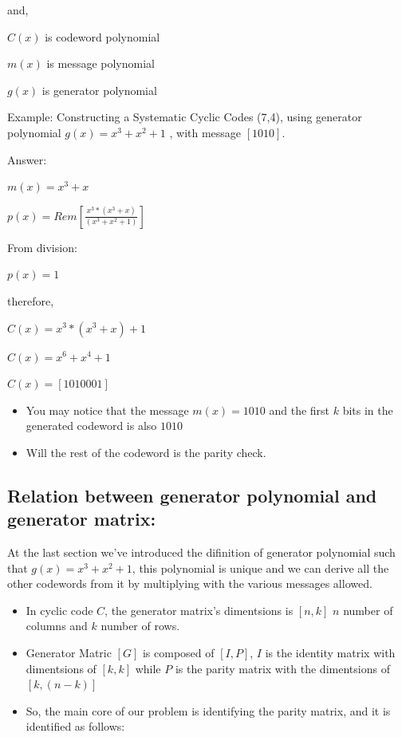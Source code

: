 \documentclass[a4paper,12pt]{report}
\begin{document}
{        and,

        $C(x)$ is codeword polynomial
        
        $m(x)$ is message polynomial
        
        $g(x)$ is generator polynomial

        \vspace{0.5cm}
        Example: Constructing a Systematic Cyclic Codes (7,4), using generator polynomial
        $g(x) = x^3 + x^2 +1$ , with message $[1 0 1 0]$.
        \vspace{0.5cm}
        
        Answer:

        $m(x) = x^3 + x$
        
        $p(x) = Rem \left[ \frac{ x^{3} *\left(x^3 + x\right) }{\left( x^3 + x^2 +1\right)} \right]$

        From division:

        $p(x) = 1$

        therefore,

        $C(x) = x^3 * \left(x^3 + x\right) + 1$
        
        $C(x) = x^6 + x^4 + 1$
        
        $C(x) = \left[1010001\right]$
        
    {\renewcommand\labelitemi{}
    \begin{itemize}
        \item You may notice that the message $m(x) = 1 0 1 0$ and the first $k$ bits in the generated
            codeword is also $1010$
        \item Will the rest of the codeword is the parity check.
    \end{itemize}

        
    \subsection{Relation between generator polynomial and generator matrix:}
        At the last section we've introduced the difinition of generator polynomial
        such that $g(x) =x^3 + x^2 +1 $, this polynomial is unique and we can derive all the other
        codewords from it by multiplying with the various messages allowed.

    {\renewcommand\labelitemi{}
    \begin{itemize}
        \item In cyclic code $C$, the generator matrix's dimentsions is $[n,k]$
            $n$ number of columns and $k$ number of rows.
        \item Generator Matric $[G]$ is composed of $[I,P]$, $I$ is the identity matrix
            with dimentsions of $[k,k]$
            while $P$ is the parity matrix with the dimentsions of $[k, (n-k)]$
        \item So, the main core of our problem is identifying the parity matrix, 
        and it is identified as follows:


\end{itemize}}}}
\end{document}
